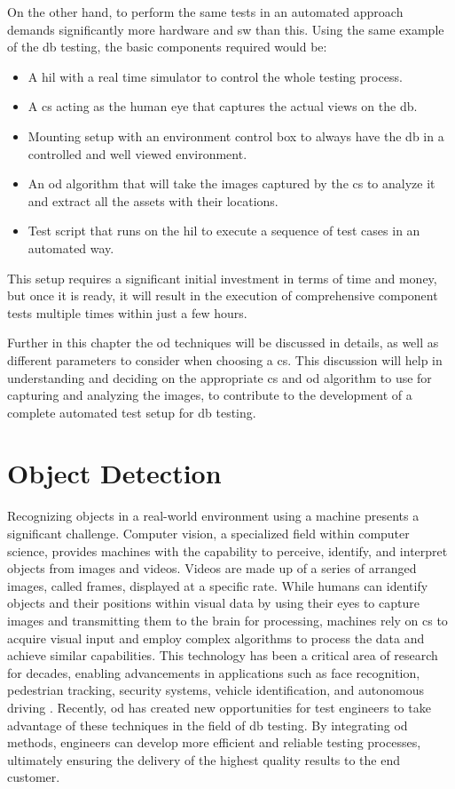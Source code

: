 On the other hand, to perform the same tests in an automated approach demands significantly more hardware and \gls{sw} than this. Using the same example of the \gls{db} testing, the basic components required would be:
\begin{itemize}
    \item A \gls{hil} with a real time simulator to control the whole testing process.
    \item  A \gls{cs} acting as the human eye that captures the actual views on the \gls{db}.
    \item Mounting setup with an environment control box to always have the \gls{db} in a controlled and well viewed environment.
    \item An \gls{od} algorithm that will take the images captured by the \gls{cs} to analyze it and extract all the assets with their locations.
    \item Test script that runs on the \gls{hil} to execute a sequence of test cases in an automated way.
\end{itemize}
This setup requires a significant initial investment in terms of time and money, but once it is ready, it will result in the execution of comprehensive component tests multiple times within just a few hours.

Further in this chapter the \gls{od} techniques will be discussed in details, as well as different parameters to consider when choosing a \gls{cs}. This discussion will help in understanding and deciding on the appropriate \gls{cs} and \gls{od} algorithm to use for capturing and analyzing the images, to contribute to the development of a complete automated test setup for \gls{db} testing.


\section{Object Detection}
Recognizing objects in a real-world environment using a machine presents a significant challenge. Computer vision, a specialized field within computer science, provides machines with the capability to perceive, identify, and interpret objects from images and videos. Videos are made up of a series of arranged images, called frames, displayed at a specific rate. While humans can identify objects and their positions within visual data by using their eyes to capture images and transmitting them to the brain for processing, machines rely on \gls{cs} to acquire visual input and employ complex algorithms to process the data and achieve similar capabilities. This technology has been a critical area of research for decades, enabling advancements in applications such as face recognition, pedestrian tracking, security systems, vehicle identification, and autonomous driving \cite{oD_Review}. Recently, \gls{od} has created new opportunities for test engineers to take advantage of these techniques in the field of \gls{db} testing. By integrating \gls{od} methods, engineers can develop more efficient and reliable testing processes, ultimately ensuring the delivery of the highest quality results to the end customer.

